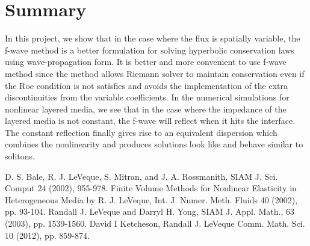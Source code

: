 \documentclass{article}
\begin{document}
\section{Summary}
In this project, we show that in the case where the flux is spatially variable, the f-wave method is a better formulation for solving hyperbolic conservation laws using wave-propagation form. It is better and more convenient to use f-wave method since the method allows Riemann solver to maintain conservation even if the Roe condition is not satisfies and avoids the implementation of the extra discontinuities from the variable coefficients. In the numerical simulations for nonlinear layered media, we see that in the case where the impedance of the layered media is not constant, the f-wave will reflect when it hits the interface. The constant reflection finally gives rise to an equivalent dispersion which combines the nonlinearity and produces solutions look like and behave similar to solitons.

\begin{thebibliography}{9}
D. S. Bale, R. J. LeVeque, S. Mitran, and J. A. Rossmanith, SIAM J. Sci. Comput 24 (2002), 955-978.
Finite Volume Methods for Nonlinear Elasticity in Heterogeneous Media
by R. J. LeVeque, Int. J. Numer. Meth. Fluids 40 (2002), pp. 93-104.
Randall J. LeVeque and Darryl H. Yong, SIAM J. Appl. Math., 63 (2003), pp. 1539-1560.
David I Ketcheson, Randall J. LeVeque Comm. Math. Sci. 10 (2012), pp. 859-874.

\end{thebibliography}
\end{document}
